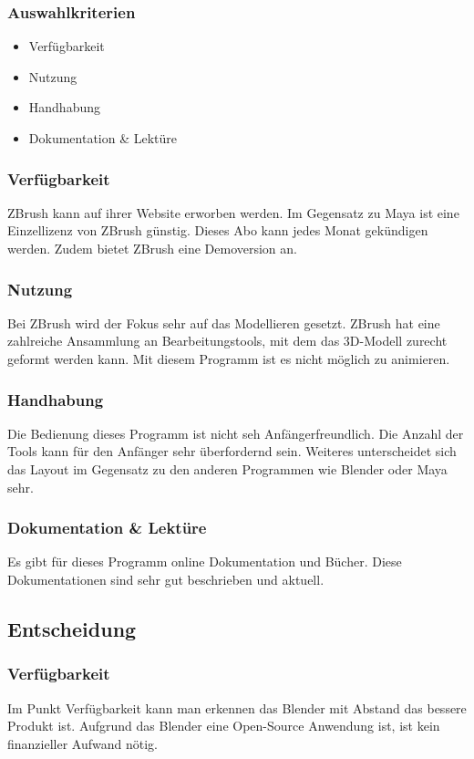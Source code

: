 \subsubsection{Auswahlkriterien}
\begin{itemize}
    \item Verfügbarkeit
    \item Nutzung
    \item Handhabung
    \item Dokumentation \& Lektüre
\end{itemize}

\subsubsection{Verfügbarkeit}
ZBrush kann auf ihrer Website erworben werden. Im Gegensatz zu Maya ist eine Einzellizenz von ZBrush günstig. Dieses Abo kann jedes Monat gekündigen werden. Zudem bietet ZBrush eine Demoversion an.

\subsubsection{Nutzung}
Bei ZBrush wird der Fokus sehr auf das Modellieren gesetzt. ZBrush hat eine zahlreiche Ansammlung an Bearbeitungstools, mit dem das 3D-Modell zurecht geformt werden kann. Mit diesem Programm ist es nicht möglich zu animieren.

\subsubsection{Handhabung}
Die Bedienung dieses Programm ist nicht seh Anfängerfreundlich. Die Anzahl der Tools kann für den Anfänger sehr überfordernd sein. Weiteres unterscheidet sich das Layout im Gegensatz zu den anderen Programmen wie Blender oder Maya sehr.

\subsubsection{Dokumentation \& Lektüre}
Es gibt für dieses Programm online Dokumentation und Bücher. Diese Dokumentationen sind sehr gut beschrieben und aktuell.

\pagebreak

\subsection{Entscheidung}
\subsubsection{Verfügbarkeit}
Im Punkt Verfügbarkeit kann man erkennen das Blender mit Abstand das bessere Produkt ist. Aufgrund das Blender eine Open-Source Anwendung ist, ist kein finanzieller Aufwand nötig.

